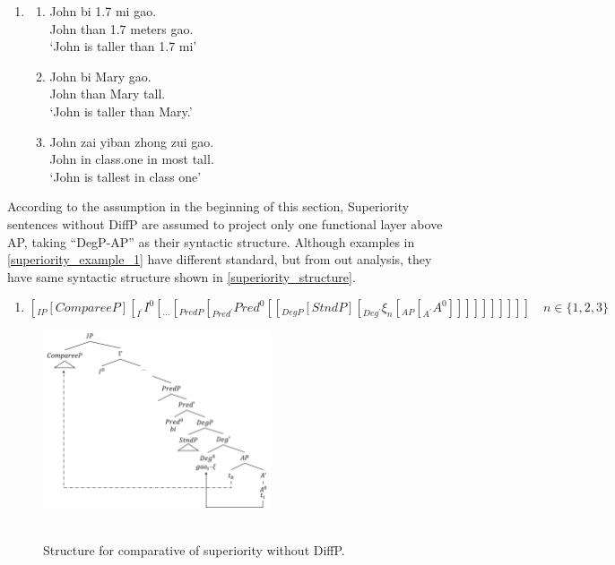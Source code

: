 \documentclass{ctexart}
\begin{document}
\begin{enumerate}
    \item \label{superiority_example_1}
    \begin{enumerate}
        \item \label{superiority_example_1_a}
        John bi 1.7 mi gao. \\
        John than 1.7 meters gao. \\
        `John is taller than 1.7 mi' 

        \item \label{superiority_example_1_b}
        John bi Mary gao. \\
        John than Mary tall. \\
        `John is taller than Mary.' 

        \item \label{superiority_example_1_c}
        John zai yiban zhong zui gao. \\
        John in class.one in most tall. \\
        `John is tallest in class one' 

    \end{enumerate}
\end{enumerate}

According to the assumption in the beginning of this section, Superiority sentences without DiffP are assumed to project only one functional layer above AP, taking ``DegP-AP'' as their syntactic structure. Although examples in \ref{superiority_example_1} have different standard, but from out analysis, they have same syntactic structure shown in \ref{superiority_structure}.

\begin{enumerate}
    \item \label{superiority_structure}
    $[_{IP} [CompareeP] [_{I^{\prime}} I^{0} [_{...}[_{PredP}[_{Pred^{\prime}} Pred^0 [[_{DegP} [StndP] [_{Deg^{\prime}} \xi_{n} [_{AP} [_{A^{\prime}} A^{0}]]]]]]]]]] \quad n \in \{1, 2, 3\}$
\end{enumerate}

\begin{figure}[H]
    \centering
    \includegraphics[width=0.6\textwidth]{pic/superiority_structure.png}
    \begin{caption}
        \\ \vspace{-1.1ex}
        Structure for comparative of superiority without DiffP.
    \end{caption}
\end{figure}
\end{document}
